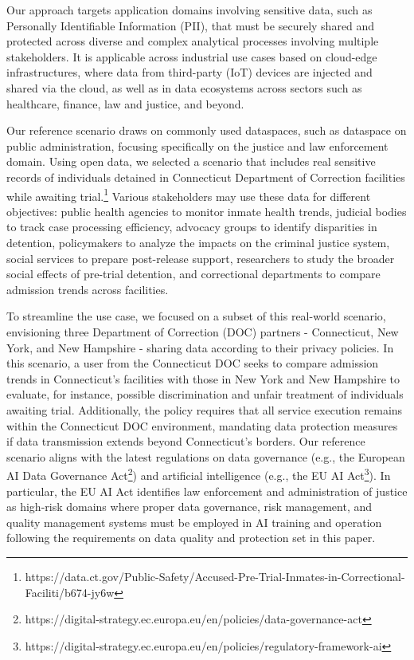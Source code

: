 {\color{OurColor}
Our approach targets application domains involving sensitive data, such as Personally Identifiable Information (PII), that must be securely shared and protected across diverse and complex analytical processes involving multiple stakeholders. It is applicable across industrial use cases based on cloud-edge infrastructures, where data from third-party (IoT) devices are injected and shared via the cloud, as well as in data ecosystems across sectors such as healthcare, finance, law and justice, and beyond.

Our reference scenario draws on commonly used dataspaces, such as dataspace on public administration, focusing specifically on the justice and law enforcement domain. Using open data, we selected a scenario that includes real sensitive records of individuals detained in Connecticut Department of Correction facilities while awaiting trial.\footnote{https://data.ct.gov/Public-Safety/Accused-Pre-Trial-Inmates-in-Correctional-Faciliti/b674-jy6w} Various stakeholders may use these data for different objectives: public health agencies to monitor inmate health trends, judicial bodies to track case processing efficiency, advocacy groups to identify disparities in detention, policymakers to analyze the impacts on the criminal justice system, social services to prepare post-release support, researchers to study the broader social effects of pre-trial detention, and correctional departments to compare admission trends across facilities.

To streamline the use case, we focused on a subset of this real-world scenario, envisioning three Department of Correction (DOC) partners - Connecticut, New York, and New Hampshire - sharing data according to their privacy policies. In this scenario, a user from the Connecticut DOC seeks to compare admission trends in Connecticut’s facilities with those in New York and New Hampshire to evaluate, for instance, possible discrimination and unfair treatment of individuals awaiting trial. Additionally, the policy requires that all service execution remains within the Connecticut DOC environment, mandating data protection measures if data transmission extends beyond Connecticut’s borders. Our reference scenario aligns with the latest regulations on data governance (e.g., the European AI Data Governance Act\footnote{https://digital-strategy.ec.europa.eu/en/policies/data-governance-act}) and artificial intelligence (e.g., the EU AI Act\footnote{https://digital-strategy.ec.europa.eu/en/policies/regulatory-framework-ai}). In particular, the EU AI Act identifies law enforcement and administration of justice as high-risk domains where proper data governance, risk management, and quality management systems must be employed in AI training and operation following the requirements on data quality and protection set in this paper.}

